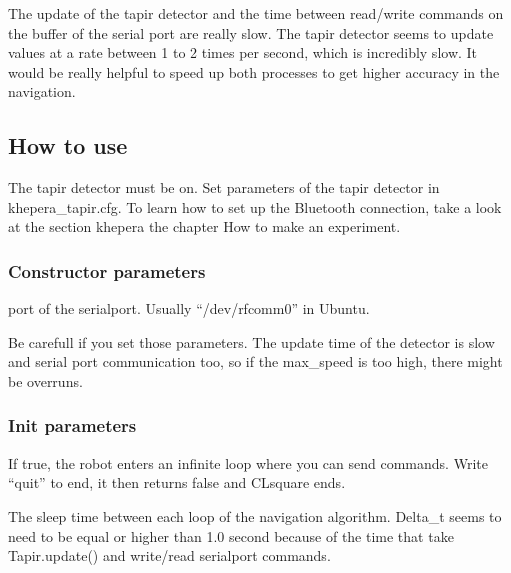 The update of the tapir detector and the time between read/write commands 
on the buffer of the serial port are really slow. The tapir detector 
seems to update values at a rate between 1 to 2 times per second, 
which is incredibly slow. It would be really helpful to speed up both 
processes to get higher accuracy in the navigation.

\subsection{How to use}
The tapir detector must be on. Set parameters of the tapir detector in 
khepera\_tapir.cfg. To learn how to set up the Bluetooth connection, 
take a look at the section khepera the chapter How to make an experiment.

\subsubsection{Constructor parameters}
    \begin{description} \itemindent=-15pt
        \item[PORT] port of the serialport. Usually “/dev/rfcomm0” in 
            Ubuntu.
        \item[Max\_speed, min\_speed (optional)] Be carefull if you set 
            those parameters. The update time of the detector is slow 
            and serial port communication too, so if the max\_speed is 
            too high, there might be overruns.
    \end{description}

\subsubsection{Init parameters}
    \begin{description} \itemindent=-15pt
        \item[manipulate] If true, the robot enters an infinite loop where 
            you can send commands. Write “quit” to end, it then returns 
            false and CLsquare ends.
        \item[delta\_t] The sleep time between each loop of the 
            navigation algorithm. Delta\_t seems to need to be equal 
            or higher than 1.0 second because of the time that 
            take Tapir.update() and write/read serialport commands.
    \end{description}

